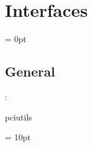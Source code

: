 
\section{Interfaces} 


\parskip = 0pt

\vspace{3mm} \subsection*{General}

: 

pciutils
\vspace{2mm}

\vspace{5mm}\parskip = 10pt 
